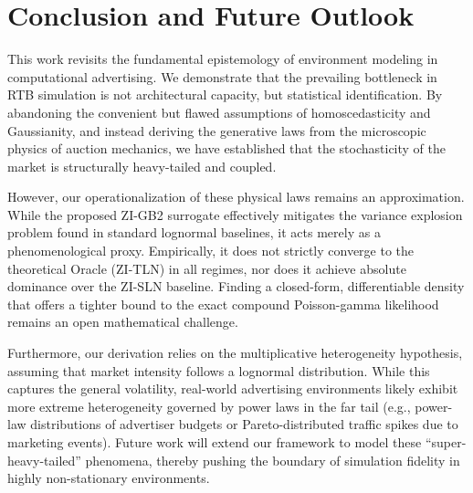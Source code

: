 \documentclass[sigconf, anonymous, review]{acmart}
\begin{document}
\section{Conclusion and Future Outlook}

This work revisits the fundamental epistemology of environment modeling in computational advertising.
We demonstrate that the prevailing bottleneck in RTB simulation is not architectural capacity, but statistical identification.
By abandoning the convenient but flawed assumptions of homoscedasticity and Gaussianity, and instead deriving the generative laws from the microscopic physics of auction mechanics, we have established that the stochasticity of the market is structurally heavy-tailed and coupled.

However, our operationalization of these physical laws remains an approximation. While the proposed ZI-GB2 surrogate effectively mitigates the variance explosion problem found in standard lognormal baselines, it acts merely as a phenomenological proxy.
Empirically, it does not strictly converge to the theoretical Oracle (ZI-TLN) in all regimes, nor does it achieve absolute dominance over the ZI-SLN baseline.
Finding a closed-form, differentiable density that offers a tighter bound to the exact compound Poisson-gamma likelihood remains an open mathematical challenge.

Furthermore, our derivation relies on the multiplicative heterogeneity hypothesis, assuming that market intensity follows a lognormal distribution.
While this captures the general volatility, real-world advertising environments likely exhibit more extreme heterogeneity governed by power laws in the far tail (e.g., power-law distributions of advertiser budgets or Pareto-distributed traffic spikes due to marketing events).
Future work will extend our framework to model these ``super-heavy-tailed'' phenomena, thereby pushing the boundary of simulation fidelity in highly non-stationary environments.


\end{document}
